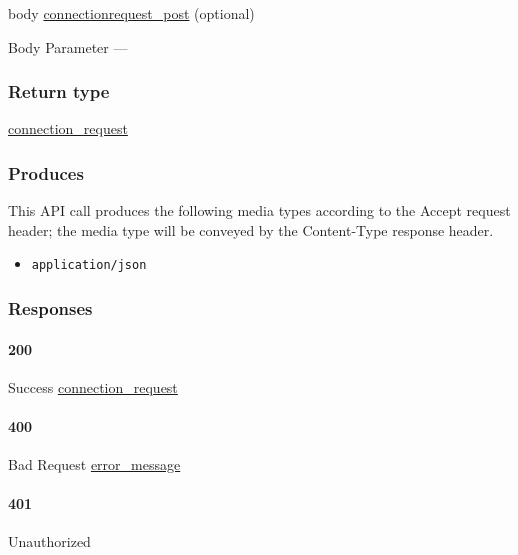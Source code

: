 body \protect\hyperlink{connectionrequest_post}{connectionrequest\_post}
(optional)

{Body Parameter} ---

\hypertarget{return-type-20}{%
\subsubsection{Return type}\label{return-type-20}}

\protect\hyperlink{connection_request}{connection\_request}

\hypertarget{produces-26}{%
\subsubsection{Produces}\label{produces-26}}

This API call produces the following media types according to the
{Accept} request header; the media type will be conveyed by the
{Content-Type} response header.

\begin{itemize}
\tightlist
\item
  \texttt{application/json}
\end{itemize}

\hypertarget{responses-26}{%
\subsubsection{Responses}\label{responses-26}}

\hypertarget{section-85}{%
\paragraph{200}\label{section-85}}

Success \protect\hyperlink{connection_request}{connection\_request}

\hypertarget{section-86}{%
\paragraph{400}\label{section-86}}

Bad Request \protect\hyperlink{error_message}{error\_message}

\hypertarget{section-87}{%
\paragraph{401}\label{section-87}}

Unauthorized \protect\hyperlink{}{}

